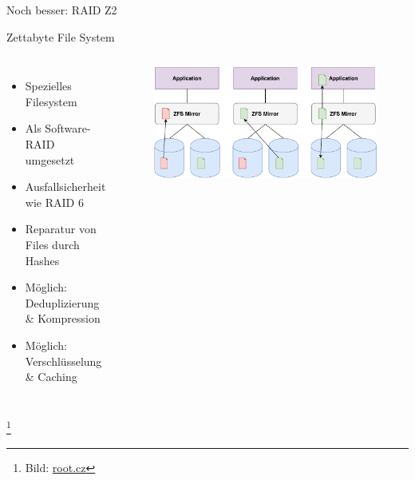 \documentclass[10pt]{beamer}
\newcommand\blfootnote[1]{%
	\begingroup
	\renewcommand\thefootnote{}\footnote{#1}%
	\addtocounter{footnote}{-1}%
	\endgroup
}
\begin{document}
%
%
\begin{frame}[fragile]{Noch besser: RAID Z2}
\begin{alertblock}{Zettabyte File System}
\end{alertblock}
\begin{columns}[T,c,onlytextwidth]
\begin{itemize}
	\item Spezielles Filesystem
	\item Als Software-RAID umgesetzt
	\item Ausfallsicherheit wie RAID 6
	\item Reparatur von Files durch Hashes
	\item Möglich: Deduplizierung \& Kompression
	\item Möglich: Verschlüsselung \& Caching
\end{itemize}
	\begin{figure}
		\includegraphics[width=1\textwidth]{images/zfs-self-healing}
	\end{figure}
\end{columns}

\blfootnote{Bild: \href{https://www.root.cz}{root.cz}}
\end{frame}
\end{document}
